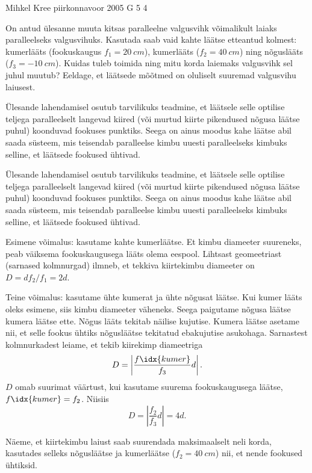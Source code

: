 {Mihkel Kree} %
{piirkonnavoor} %
{2005} %
{G 5} %
{4} %
{
\ifStatement
On antud ülesanne muuta kitsas paralleelne valgusvihk võimalikult laiaks paralleelseks valgusvihuks. Kasutada saab vaid kahte läätse etteantud kolmest: kumerlääts (fookuskaugus $f_1 = \SI{20}{cm}$), kumerlääts ($f_2 = \SI{40}{cm}$) ning nõguslääts ($f_3 = \SI{-10}{cm}$). Kuidas tuleb toimida ning mitu korda laiemaks valgusvihk sel juhul muutub? Eeldage, et läätsede mõõtmed on oluliselt suuremad valgusvihu laiusest.
\fi


\ifHint
Ülesande lahendamisel osutub tarvilikuks teadmine, et läätsele selle optilise teljega paralleelselt langevad kiired (või murtud kiirte pikendused nõgusa läätse puhul) koonduvad fookuses punktiks. Seega on ainus moodus kahe läätse abil saada süsteem, mis teisendab paralleelse kimbu uuesti paralleelseks kimbuks selline, et läätsede fookused ühtivad. 
\fi


\ifSolution
Ülesande lahendamisel osutub tarvilikuks teadmine, et läätsele selle optilise teljega paralleelselt langevad kiired (või murtud kiirte pikendused nõgusa läätse puhul) koonduvad fookuses punktiks. Seega on ainus moodus kahe läätse abil saada süsteem, mis teisendab paralleelse kimbu uuesti paralleelseks kimbuks selline, et läätsede fookused ühtivad. 

Esimene võimalus: kasutame kahte kumerläätse. Et kimbu diameeter suureneks, peab väiksema fookuskaugusega lääts olema eespool. Lihtsast geomeetriast (sarnased kolmnurgad) ilmneb, et tekkiva kiirtekimbu diameeter on $D = df_2/f_1 = 2d$.

Teine võimalus: kasutame ühte kumerat ja ühte nõgusat läätse. Kui kumer lääts oleks esimene, siis kimbu diameeter väheneks. Seega paigutame nõgusa läätse kumera läätse ette. Nõgus lääts tekitab näilise kujutise. Kumera läätse asetame nii, et selle fookus ühtiks nõgusläätse tekitatud ebakujutise asukohaga. Sarnastest kolmnurkadest leiame, et tekib kiirekimp diameetriga
\[
D = \left|\frac{f\idx{kumer}}{f_3}d\right|.
\]
$D$ omab suurimat väärtust, kui kasutame suurema fookuskaugusega läätse, $f\idx{kumer} = f_2$. Niisiis
\[
D = \left|\frac{f_2}{f_3}d\right| = 4d.
\]


Näeme, et kiirtekimbu laiust saab suurendada maksimaalselt neli korda, kasutades selleks nõgusläätse ja kumerläätse ($f_2 = \SI{40}{cm}$) nii, et nende fookused ühtiksid.
\fi
}